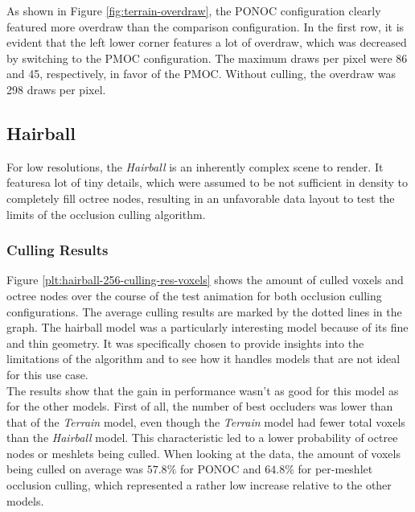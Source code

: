 \noindent
As shown in Figure \ref{fig:terrain-overdraw}, the \ac{PONOC} configuration clearly 
featured more overdraw than the comparison configuration. In the first row, it is evident that 
the left lower corner features a lot of overdraw, which was decreased by switching to the 
\ac{PMOC} configuration. The maximum draws per pixel were 86 and 45, respectively, in 
favor of the \ac{PMOC}. Without culling, the overdraw was 298 draws per pixel.

\clearpage



\subsection*{Hairball}

For low resolutions, the \emph{Hairball} is an inherently complex scene to render. It featuresa lot of 
tiny details, which were assumed to be not sufficient in density to completely fill octree nodes, 
resulting in an unfavorable data layout to test the limits of the occlusion culling algorithm.

\subsubsection*{Culling Results} \label{subsubsec-culling-results-hairball}

Figure \ref{plt:hairball-256-culling-res-voxels} shows the amount of culled voxels and octree nodes 
over the course of the test animation for both occlusion culling configurations. The average culling 
results are marked by the dotted lines in the graph. The hairball model was a particularly interesting 
model because of its fine and thin geometry. It was specifically chosen to provide insights into the 
limitations of the algorithm and to see how it handles models that are not ideal for this use case.\\

\noindent
The results show that the gain in performance wasn't as good for this model as for the other models.
First of all, the number of best occluders was lower than that of the \emph{Terrain} model, even though the 
\emph{Terrain} model had fewer total voxels than the \emph{Hairball} model. This characteristic led to 
a lower probability of octree nodes or meshlets being culled. When looking at the data, the amount of 
voxels being culled on average was $57.8\%$ for \ac{PONOC} and $64.8\%$ for per-meshlet 
occlusion culling, which represented a rather low increase relative to the other models. 

